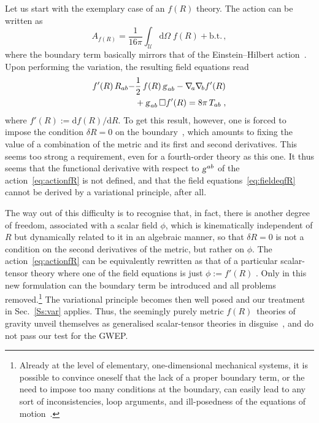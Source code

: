 \documentclass[a4paper,showkeys,aps,prd,reprint,nofootinbib,showpacs,twocolumn]{revtex4-1}
\newcommand{\de}{\mathrm{d}}
\newcommand{\ton}[1]{\left(#1\right)}
\newcommand{\eq}[1]{\( #1 \)}
\newcommand{\eqd}[1]{\begin{equation} #1 \end{equation}}
\newcommand{\speq}[1]{\begin{equation}\begin{split}#1\end{split}\end{equation}}
\newcommand{\matg}{\text{\textsl{g}}}%
\theoremstyle{plain}
\begin{document}
Let us start with the exemplary case of an \eq{f \! \ton{R}} theory. The action can be written as
%
\eqd{A_{f\! \ton{R}} = \frac{1}{16 \pi} \int_{\mathscr{U}} \de \Omega \; f \! \ton{R} 
+ \text{b.t.} \,, \label{eq:actionfR}}
%
where the boundary term basically mirrors that of the Einstein--Hilbert action~\cite{Guarnizo:2010xr}.  Upon performing the variation, the resulting field equations read
%
\speq{f' \! \ton{R} R_{a b} - &\frac{1}{2}\,f \! \ton{R} \matg_{a b} - \nabla_{\! a} \nabla_{\! b} f' \! \ton{R} \\
&+ \matg_{a b}\, \square f' \! \ton{R} = 8\pi\, T_{ab}\;, \label{eq:fieldeqfR}}
%
where \eq{f' \! \ton{R} := \de f \! \ton{R} / \de R}. To get this result, however, one is forced to impose the condition \eq{\delta R = 0} on the boundary~\cite{Guarnizo:2010xr}, which amounts to fixing the value of a combination of the metric and its first and second derivatives.  This seems too strong a requirement, even for a fourth-order theory as this one.  It thus seems that the functional derivative with respect to \eq{\matg^{ab}} of the action~\eqref{eq:actionfR} is not defined, and that the field equations~\eqref{eq:fieldeqfR} cannot be derived by a variational principle, after all.

The way out of this difficulty is to recognise that, in fact, there is another degree of freedom, associated with a scalar field \eq{\phi}, which is  kinematically independent of \eq{R} but dynamically related to it in an algebraic manner, so that \eq{\delta R = 0} is not a condition on the second derivatives of the metric, but rather on \eq{\phi}.  The action~\eqref{eq:actionfR} can be equivalently rewritten as that of a particular scalar-tensor theory where one of the field equations is just \eq{\phi := f' \! \ton{R}} \cite{Sotiriou:2007zu}.  Only in this new formulation can the boundary term be introduced and all problems removed.\footnote{Already at the level of elementary, one-dimensional mechanical systems, it is possible to convince oneself that the lack of a proper boundary term, or the need to impose too many conditions at the boundary, can easily lead to any sort of inconsistencies, loop arguments, and ill-posedness of the equations of motion~\cite{Dyer:2008hb}.}  The variational principle becomes then well posed and our treatment in Sec.~\ref{Ss:var} applies.  Thus, the seemingly purely metric \eq{f \! \ton{R}}\ theories of gravity unveil themselves as generalised scalar-tensor theories in disguise~\cite{Sotiriou:2008rp}, and do not pass our test for the GWEP.
\end{document}
